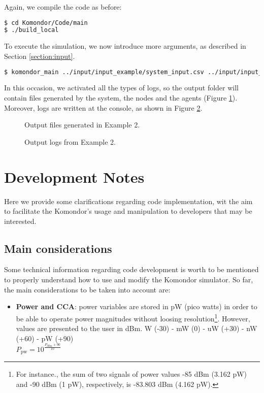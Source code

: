 \documentclass[a4paper]{article}
\begin{document}
Again, we compile the code as before:
\begin{lstlisting}[language=bash,caption={Compling the code}]
$ cd Komondor/Code/main
$ ./build_local
\end{lstlisting}

To execute the simulation, we now introduce more arguments, as described in Section \ref{section:input}.
\begin{lstlisting}[language=bash,caption={Executing the code}]
$ komondor_main ../input/input_example/system_input.csv ../input/input_example/nodes_input.csv ../input/input_example/agents.csv 1 1 1 1 1 1 120 432
\end{lstlisting}

In this occasion, we activated all the types of logs, so the output folder will contain files generated by the system, the nodes and the agents (Figure \ref{fig:output_folder}). Moreover, logs are written at the console, as shown in Figure \ref{fig:example_2_console_output}.

\begin{figure}[h!]
	\centering
	\caption{Output files generated in Example 2.}
	\label{fig:output_folder}
\end{figure}

\begin{figure}[h!]
	\centering
	\caption{Output logs from Example 2.}
	\label{fig:example_2_console_output}
\end{figure}

\section{Development Notes}
Here we provide some clarifications regarding code implementation, wit the aim to facilitate the Komondor's usage and manipulation to developers that may be interested.

\subsection{Main considerations}
\label{section:development_considerations}
Some technical information regarding code development is worth to be mentioned to properly understand how to use and modify the Komondor simulator. So far, the main considerations to be taken into account are:		
\begin{itemize}
	\item \textbf{Power and CCA}: power variables are stored in pW (pico watts) in order to be able to operate power magnitudes without loosing resolution\footnote{For instance., the sum of two signals of power values -85 dBm (3.162 pW) and -90 dBm (1 pW), respectively, is -83.803 dBm (4.162 pW).}. However, values are presented to the user in dBm.		
	W (-30)  - mW (0)  - uW (+30) - nW (+60) - pW (+90)\\
	$P_{\text{pw}} = 10^{\frac{P_{\text{dBm}} + 90}{10}}$
\end{itemize}
\end{document}
